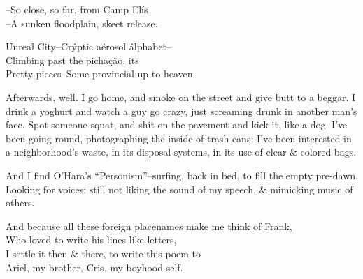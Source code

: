 --So close, so far, from Camp Elís \\
--A sunken floodplain, skeet release. %

Unreal City--Crýptic aérosol álphabet-- \\
Climbing past the pichação, its \\
Pretty pieces--Some provincial up to heaven.

Afterwards, well. I go home, and smoke on the street and give butt to a beggar. I drink a yoghurt and watch a guy go crazy, just screaming drunk in another man's face. Spot someone squat, and shit on the pavement and kick it, like a dog. I've been going round, photographing the inside of trash cans; I've been interested in a neighborhood's waste, in its disposal systems, in its use of clear \& colored bags.

And I find O'Hara's ``Personism''--surfing, back in bed, to fill the empty pre-dawn. Looking for voices; still not liking the sound of my speech, \& mimicking music of others.

And because all these foreign placenames make me think of Frank, \\
Who loved to write his lines like letters, \\
I settle it then \& there, to write this poem to \\
Ariel, my brother, Cris, my boyhood self.